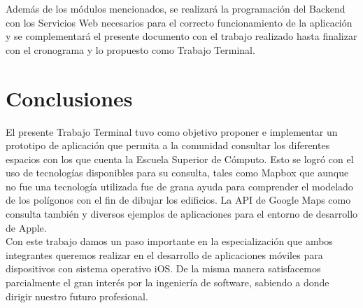 Además de los módulos mencionados, se realizará la programación del Backend con los Servicios Web necesarios para el correcto funcionamiento de la aplicación y se complementará el presente documento con el trabajo realizado hasta finalizar con el cronograma y lo propuesto como Trabajo Terminal.

\section{Conclusiones}

El presente Trabajo Terminal tuvo como objetivo proponer e implementar un prototipo de aplicación que permita a la comunidad consultar los diferentes espacios con los que cuenta la Escuela Superior de Cómputo. Esto se logró con el uso de tecnologías disponibles para su consulta, tales como Mapbox que aunque no fue una tecnología utilizada fue de grana ayuda para comprender el modelado de los polígonos con el fin de dibujar los edificios. La API de Google Maps como consulta también y diversos ejemplos de aplicaciones para el entorno de desarrollo de Apple.\\

Con este trabajo damos un paso importante en la especialización que ambos integrantes queremos realizar en el desarrollo de aplicaciones móviles para dispositivos con sistema operativo iOS. De la misma manera satisfacemos parcialmente el gran interés por la ingeniería de software, sabiendo a donde dirigir nuestro futuro profesional.